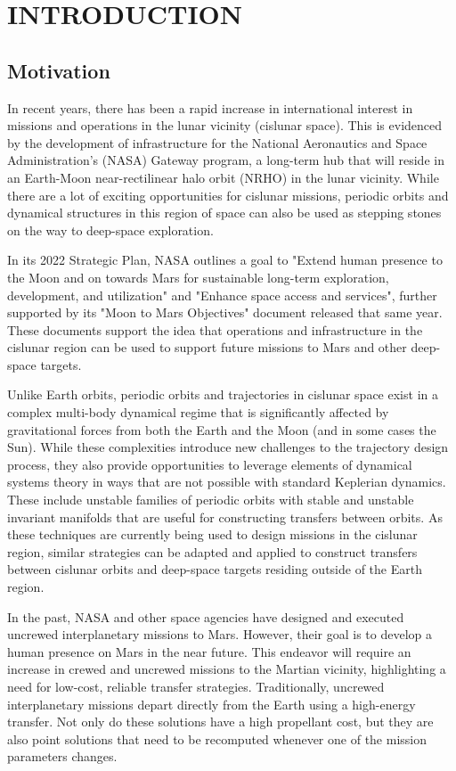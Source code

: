 \chapter{INTRODUCTION}
\section{Motivation}
In recent years, there has been a rapid increase in international interest in missions and
operations in the lunar vicinity (cislunar space). This is evidenced by the development of
infrastructure for the National Aeronautics and Space Administration's (NASA) Gateway program, a
long-term hub that will reside in an Earth-Moon near-rectilinear halo orbit (NRHO) in the lunar
vicinity\cite{Zamora:2024}. While there are a lot of exciting opportunities for cislunar missions,
periodic orbits and dynamical structures in this region of space can also be used as stepping
stones on the way to deep-space exploration.

In its 2022 Strategic Plan, NASA outlines a goal to "Extend human presence to the Moon and on
towards Mars for sustainable long-term exploration, development, and utilization" and "Enhance
space access and services"\cite{NASA:2022s}, further supported by its "Moon to Mars
Objectives" document released that same year\cite{NASA:2022m}. These documents support the idea
that operations and infrastructure in the cislunar region can be used to support future missions to
Mars and other deep-space targets.

Unlike Earth orbits, periodic orbits and trajectories in cislunar space exist in a complex
multi-body dynamical regime that is significantly affected by gravitational forces from both the
Earth and the Moon (and in some cases the Sun). While these complexities introduce new challenges
to the trajectory design process, they also provide opportunities to leverage elements of dynamical
systems theory in ways that are not possible with standard Keplerian dynamics. These include
unstable families of periodic orbits with stable and unstable invariant manifolds that are useful
for constructing transfers between orbits. As these techniques are currently being used to design
missions in the cislunar region, similar strategies can be adapted and applied to construct
transfers between cislunar orbits and deep-space targets residing outside of the Earth region.

In the past, NASA and other space agencies have designed and executed uncrewed interplanetary
missions to Mars. However, their goal is to develop a human presence on Mars in the near future.
This endeavor will require an increase in crewed and uncrewed missions to the Martian vicinity,
highlighting a need for low-cost, reliable transfer strategies. Traditionally, uncrewed
interplanetary missions depart directly from the Earth using a high-energy
transfer\cite{Drake:2009}. Not only do these solutions have a high propellant cost, but they are
also point solutions that need to be recomputed whenever one of the mission parameters
changes.

